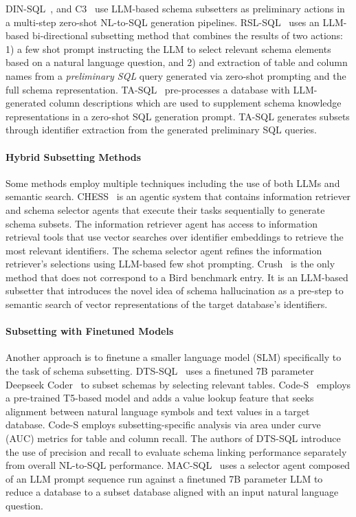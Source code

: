 DIN-SQL~\cite{pourreza2023dinsql}, and C3~\cite{dong2023c3} use LLM-based schema subsetters as preliminary actions in a multi-step zero-shot NL-to-SQL generation pipelines.
RSL-SQL~\cite{cao2024rslsqlrobustschemalinking} uses an LLM-based bi-directional subsetting method that combines the results of two actions: 1) a few shot prompt instructing the LLM to select relevant schema elements based on a natural language question, and 2) and extraction of table and column names from a \emph{preliminary SQL} query generated via zero-shot prompting and the full schema representation. 
TA-SQL~\cite{qu2024generationalignitnovel} pre-processes a database with LLM-generated column descriptions which are used to supplement schema knowledge representations in a zero-shot SQL generation prompt.
TA-SQL generates subsets through identifier extraction from the generated preliminary SQL queries.

\paragraph{\textbf{Hybrid Subsetting Methods}}

Some methods employ multiple techniques including the use of both LLMs and semantic search.
CHESS~\cite{talaei2024chesscontextualharnessingefficient} is an agentic system that contains information retriever and schema selector agents that execute their tasks sequentially to generate schema subsets. 
The information retriever agent has access to information retrieval tools that use vector searches over identifier embeddings to retrieve the most relevant identifiers.
The schema selector agent refines the information retriever's selections using LLM-based few shot prompting.
Crush~\cite{kothyari-etal-2023-crush4sql} is the only method that does not correspond to a Bird benchmark entry. It is an LLM-based subsetter that introduces the novel idea of schema hallucination as a pre-step to semantic search of vector representations of the target database's identifiers.

\paragraph{\textbf{Subsetting with Finetuned Models}}

Another approach is to finetune a smaller language model (SLM) specifically to the task of schema subsetting.
DTS-SQL~\cite{pourreza2024dtssql} uses a finetuned 7B parameter Deepseek Coder~\cite{deepseek-coder} to subset schemas by selecting relevant tables. 
Code-S~\cite{li2024codes} employs a pre-trained T5-based model and adds a value lookup feature that seeks alignment between natural language symbols and text values in a target database. Code-S employs subsetting-specific analysis via area under curve (AUC) metrics for table and column recall.
The authors of DTS-SQL introduce the use of precision and recall to evaluate schema linking performance separately from overall NL-to-SQL performance.
MAC-SQL~\cite{wang2024macsql} uses a selector agent composed of an LLM prompt sequence run against a finetuned 7B parameter LLM to reduce a database to a subset database aligned with an input natural language question. 



